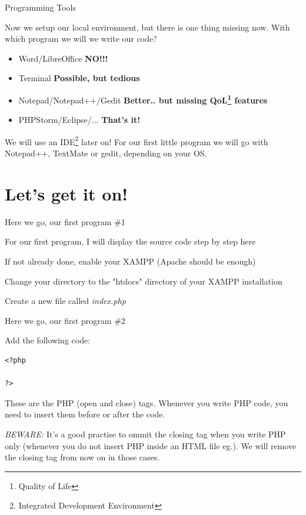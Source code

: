 \begin{frame}{Programming Tools}

Now we setup our local environment, but there is one thing missing now.
With which program we will we write our code? \pause

	\begin{itemize}
		\item Word/LibreOffice \pause \textbf{NO!!!} \pause
		\item Terminal \pause \textbf{Possible, but tedious} \pause
		\item Notepad/Notepad++/Gedit \pause \textbf{Better.. but missing QoL\footnote{Quality of Life} features} \pause
		\item PHPStorm/Eclipse/... \pause \textbf{That's it!} \pause
	\end{itemize}

	We will use an IDE\footnote{Integrated Development Environment} later on!
	For our first little program we will go with Notepad++, TextMate or gedit, depending on your OS.

\end{frame}

\section{Let's get it on!}
\begin{frame}[fragile]{Here we go, our first program \#{}1}

For our first program, I will display the source code step by step here \pause

If not already done, enable your XAMPP (Apache should be enough) \pause

Change your directory to the "htdocs" directory of your XAMPP installation \pause

Create a new file called \textit{index.php} \pause

\end{frame}


\begin{frame}[fragile]{Here we go, our first program \#{}2}

Add the following code:

	\begin{lstlisting}
<?php

?>
	\end{lstlisting}

	\pause
	These are the PHP (open and close) tags. Whenever you write PHP code, you need to insert them before or after the code. \pause

	\emph{BEWARE:} It's a good practise to ommit the closing tag when you write PHP only (whenever you do not insert PHP inside an HTML file eg.). We will remove the closing tag from now on in those cases.
\end{frame}

